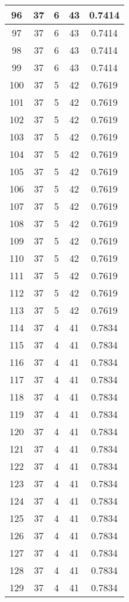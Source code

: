 \documentclass[letterpaper, 12pt]{article}
\begin{document}
\begin{longtable}{|c|c|c|c|c|}
\hline
96 & 37 & 6 & 43 & 0.7414 \\
\hline
97 & 37 & 6 & 43 & 0.7414 \\
\hline
98 & 37 & 6 & 43 & 0.7414 \\
\hline
99 & 37 & 6 & 43 & 0.7414 \\
\hline
100 & 37 & 5 & 42 & 0.7619 \\
\hline
101 & 37 & 5 & 42 & 0.7619 \\
\hline
102 & 37 & 5 & 42 & 0.7619 \\
\hline
103 & 37 & 5 & 42 & 0.7619 \\
\hline
104 & 37 & 5 & 42 & 0.7619 \\
\hline
105 & 37 & 5 & 42 & 0.7619 \\
\hline
106 & 37 & 5 & 42 & 0.7619 \\
\hline
107 & 37 & 5 & 42 & 0.7619 \\
\hline
108 & 37 & 5 & 42 & 0.7619 \\
\hline
109 & 37 & 5 & 42 & 0.7619 \\
\hline
110 & 37 & 5 & 42 & 0.7619 \\
\hline
111 & 37 & 5 & 42 & 0.7619 \\
\hline
112 & 37 & 5 & 42 & 0.7619 \\
\hline
113 & 37 & 5 & 42 & 0.7619 \\
\hline
114 & 37 & 4 & 41 & 0.7834 \\
\hline
115 & 37 & 4 & 41 & 0.7834 \\
\hline
116 & 37 & 4 & 41 & 0.7834 \\
\hline
117 & 37 & 4 & 41 & 0.7834 \\
\hline
118 & 37 & 4 & 41 & 0.7834 \\
\hline
119 & 37 & 4 & 41 & 0.7834 \\
\hline
120 & 37 & 4 & 41 & 0.7834 \\
\hline
121 & 37 & 4 & 41 & 0.7834 \\
\hline
122 & 37 & 4 & 41 & 0.7834 \\
\hline
123 & 37 & 4 & 41 & 0.7834 \\
\hline
124 & 37 & 4 & 41 & 0.7834 \\
\hline
125 & 37 & 4 & 41 & 0.7834 \\
\hline
126 & 37 & 4 & 41 & 0.7834 \\
\hline
127 & 37 & 4 & 41 & 0.7834 \\
\hline
128 & 37 & 4 & 41 & 0.7834 \\
\hline
129 & 37 & 4 & 41 & 0.7834 \\

\end{longtable}
\end{document}
